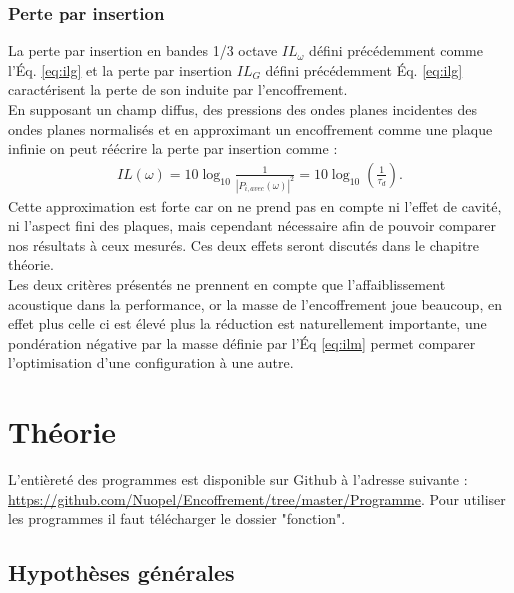 \documentclass[12pt,foolscap]{report}
\begin{document}
	\subsection*{Perte par insertion}
	La perte par  insertion en bandes 1/3 octave \(I{L_\omega}\) défini précédemment comme l'Éq. \ref{eq:ilg} et la perte par insertion $I{L_G}$  défini précédemment  Éq. \ref{eq:ilg} caractérisent la perte de son induite par l'encoffrement.\\
	En supposant un champ diffus, des pressions des ondes planes incidentes des ondes planes normalisés et en approximant un encoffrement comme une plaque infinie on peut réécrire la perte par insertion comme : \\
	\begin{align}
	IL(\omega) = 10{\log _{10}}\frac{1}{{{{\left| {{P_{i,avec}}(\omega )} \right|}^2}}}=10{\log _{10}}\left( {\frac{1}{\tau_d }} \right)\text{.}
	\end{align}
	Cette approximation est forte car on ne prend pas en compte ni l'effet de cavité, ni l'aspect fini des plaques, mais cependant nécessaire afin de pouvoir comparer nos résultats à ceux mesurés. Ces deux effets seront discutés dans le chapitre théorie. \\
	
	Les deux critères présentés  ne prennent en compte que l'affaiblissement acoustique dans la performance, or la masse de l'encoffrement joue beaucoup, en effet plus celle ci est élevé plus la réduction est naturellement importante, une pondération négative par la masse  définie par l'Éq \ref{eq:ilm} permet comparer l'optimisation d'une configuration  à une autre.
	
	
	
	
	\chapter{Théorie}
	L'entièreté des programmes est disponible sur Github à l'adresse suivante :\\
	\href{https://github.com/Nuopel/Encoffrement/tree/master/Programme}{https://github.com/Nuopel/Encoffrement/tree/master/Programme}. Pour utiliser les programmes il faut télécharger le dossier "fonction".
	\section{Hypothèses générales}
	
\end{document}
